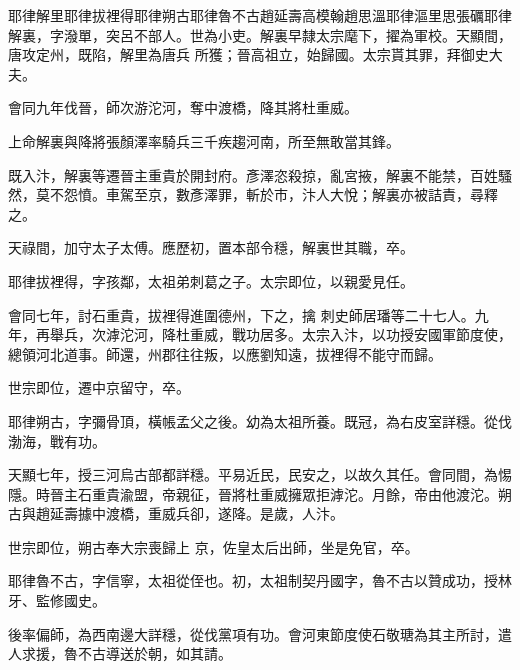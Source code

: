 
\begin{pinyinscope}

 耶律解里耶律拔裡得耶律朔古耶律魯不古趙延壽高模翰趙思溫耶律漚里思張礪耶律解裏，字潑單，突呂不部人。世為小吏。解裏早隸太宗麾下，擢為軍校。天顯間，唐攻定州，既陷，解里為唐兵
 所獲；晉高祖立，始歸國。太宗貰其罪，拜御史大夫。



 會同九年伐晉，師次游沱河，奪中渡橋，降其將杜重威。



 上命解裏與降將張顏澤率騎兵三千疾趨河南，所至無敢當其鋒。



 既入汴，解裏等遷晉主重貴於開封府。彥澤恣殺掠，亂宮掖，解裏不能禁，百姓騷然，莫不怨憤。車駕至京，數彥澤罪，斬於市，汴人大悅；解裏亦被詰責，尋釋之。



 天祿間，加守太子太傅。應歷初，置本部令穩，解裏世其職，卒。



 耶律拔裡得，字孩鄰，太祖弟刺葛之子。太宗即位，以親愛見任。



 會同七年，討石重貴，拔裡得進圍德州，下之，擒
 刺史師居璠等二十七人。九年，再舉兵，次滹沱河，降杜重威，戰功居多。太宗入汴，以功授安國軍節度使，總領河北道事。師還，州郡往往叛，以應劉知遠，拔裡得不能守而歸。



 世宗即位，遷中京留守，卒。



 耶律朔古，字彌骨頂，橫帳孟父之後。幼為太祖所養。既冠，為右皮室詳穩。從伐渤海，戰有功。



 天顯七年，授三河烏古部都詳穩。平易近民，民安之，以故久其任。會同間，為惕隱。時晉主石重貴渝盟，帝親征，晉將杜重威擁眾拒滹沱。月餘，帝由他渡沱。朔古與趙延壽據中渡橋，重威兵卻，遂降。是歲，人汴。



 世宗即位，朔古奉大宗喪歸上
 京，佐皇太后出師，坐是免官，卒。



 耶律魯不古，字信寧，太祖從侄也。初，太祖制契丹國字，魯不古以贊成功，授林牙、監修國史。



 後率偏師，為西南邊大詳穩，從伐黨項有功。會河東節度使石敬瑭為其主所討，遣人求援，魯不古導送於朝，如其請。




\end{pinyinscope}
